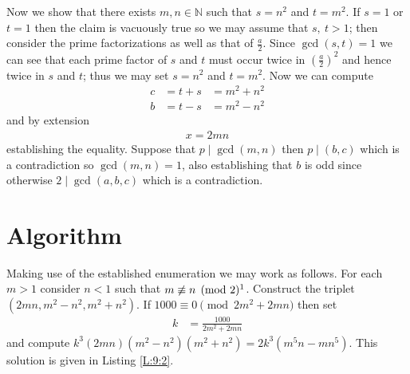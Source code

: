 \documentclass[oneside,12pt]{book}   	%
\newcounter{ex}
\newcounter{pr}
\theoremstyle{definition}
\begin{document}
\begin{spacing}{1.618}
			Now we show that there exists $m, n\in\mathbb{N}$ such that $s=n^2$ and $t=m^2$.  If $s=1$ or $t=1$ then the claim is vacuously true so we may assume that $s,~t>1$; then consider the prime factorizations as well as that of $\frac{a}{2}$. Since $\gcd{(s, t)}=1$ we can see that each prime factor of $s$ and $t$ must occur twice in $\left(\frac{a}{2}\right)^2$ and hence twice in $s$ and $t$; thus we may set $s=n^2$ and $t=m^2$. Now we can compute
			\begin{alignat}{4}
				c&=t+s&=m^2+n^2 \\
				b&=t-s&=m^2-n^2
			\end{alignat}
			and by extension 
			\begin{alignat}{4}
				x=2mn
			\end{alignat}
			establishing the equality. Suppose that $p\mid \gcd{(m, n)}$ then $p\mid{(b, c)}$ which is a contradiction so $\gcd{(m, n)}=1$, also establishing that $b$ is odd since otherwise $2\mid\gcd{(a, b, c)}$ which is a contradiction. 
			
		\section{Algorithm}

			

			Making use of the established enumeration we may work as follows. For each $m>1$ consider $n<1$ such that $m\not\equiv n\pmod{2}\footnote{For sufficiently large $m$ it will become more efficient to compute the prime factorization of $m$ and enumerate the $n<m$ that are coprime.}$. Construct the triplet $(2mn, m^2-n^2, m^2+n^2)$. If $1000 \equiv 0 \pmod{2m^2+2mn}$ then set
			\begin{alignat}{4}
				k&=\frac{1000}{2m^2+2mn}
			\end{alignat}
			and compute $k^3(2mn)(m^2-n^2)(m^2+n^2)=2k^3\left(m^5n-mn^5\right)$. This solution is given in Listing \ref{L:9:2}. 
				


\end{spacing}
\end{document}
